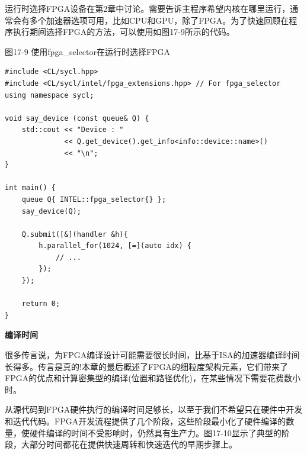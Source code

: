 运行时选择FPGA设备在第2章中讨论。需要告诉主程序希望内核在哪里运行，通常会有多个加速器选项可用，比如CPU和GPU，除了FPGA。为了快速回顾在程序执行期间选择FPGA的方法，可以使用如图17-9所示的代码。\par

\hspace*{\fill} \par %
图17-9 使用fpga\_selector在运行时选择FPGA
\begin{lstlisting}[caption={}]
#include <CL/sycl.hpp>
#include <CL/sycl/intel/fpga_extensions.hpp> // For fpga_selector
using namespace sycl;

void say_device (const queue& Q) {
	std::cout << "Device : "
			  << Q.get_device().get_info<info::device::name>() 
			  << "\n";
}

int main() {
	queue Q{ INTEL::fpga_selector{} };
	say_device(Q);
	
	Q.submit([&](handler &h){
		h.parallel_for(1024, [=](auto idx) {
			// ...
		});
	});

	return 0;
}
\end{lstlisting}

\hspace*{\fill} \par %
\textbf{编译时间}

很多传言说，为FPGA编译设计可能需要很长时间，比基于ISA的加速器编译时间长得多。传言是真的!本章的最后概述了FPGA的细粒度架构元素，它们带来了FPGA的优点和计算密集型的编译(位置和路径优化)，在某些情况下需要花费数小时。\par

从源代码到FPGA硬件执行的编译时间足够长，以至于我们不希望只在硬件中开发和迭代代码。FPGA开发流程提供了几个阶段，这些阶段最小化了硬件编译的数量，使硬件编译的时间不受影响时，仍然具有生产力。图17-10显示了典型的阶段，大部分时间都花在提供快速周转和快速迭代的早期步骤上。\par

